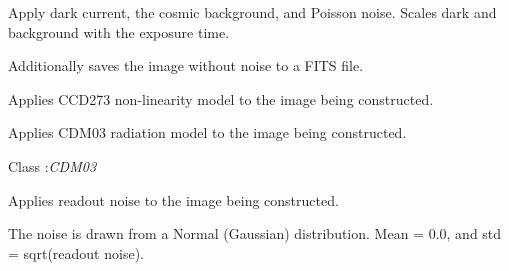 \documentclass[a4paper,12pt,english]{sphinxmanual}
\begin{document}
\begin{fulllineitems}

\begin{fulllineitems}
\label{simulator:simulator.simulator.VISsimulator.applyNoise}
Apply dark current, the cosmic background, and Poisson noise.
Scales dark and background with the exposure time.

Additionally saves the image without noise to a FITS file.

\end{fulllineitems}


\begin{fulllineitems}
\label{simulator:simulator.simulator.VISsimulator.applyNonlinearity}
Applies CCD273 non-linearity model to the image being constructed.

\end{fulllineitems}


\begin{fulllineitems}
\label{simulator:simulator.simulator.VISsimulator.applyRadiationDamage}
Applies CDM03 radiation model to the image being constructed.




Class :\emph{CDM03}



\end{fulllineitems}


\begin{fulllineitems}
\label{simulator:simulator.simulator.VISsimulator.applyReadoutNoise}
Applies readout noise to the image being constructed.

The noise is drawn from a Normal (Gaussian) distribution.
Mean = 0.0, and std = sqrt(readout noise).

\end{fulllineitems}



\end{fulllineitems}
\end{document}
